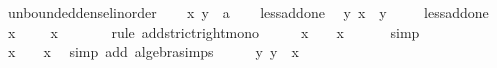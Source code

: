 \begin{isabellebody}
\endisatagproof
{\isafoldproof}%
%
\isadelimproof
\isanewline
%
\endisadelimproof
\isanewline
{}\isamarkupfalse%
\ unbounded{\isacharunderscore}{\kern0pt}dense{\isacharunderscore}{\kern0pt}linorder\isanewline
%
\isadelimproof
%
\endisadelimproof
%
\isatagproof
{}\isamarkupfalse%
\isanewline
\ \ \isamarkupfalse%
\ x\ y\ {\isacharcolon}{\kern0pt}{\isacharcolon}{\kern0pt}\ {\isacharprime}{\kern0pt}a\isanewline
\ \ \isamarkupfalse%
\ less{\isacharunderscore}{\kern0pt}add{\isacharunderscore}{\kern0pt}one\ \isamarkupfalse%
\ {\isachardoublequoteopen}{\isasymexists}y{\isachardot}{\kern0pt}\ x\ {\isacharless}{\kern0pt}\ y{\isachardoublequoteclose}\ \isacommand{{\isachardot}{\kern0pt}{\isachardot}{\kern0pt}}\isamarkupfalse%
\isanewline
\ \ \isamarkupfalse%
\ less{\isacharunderscore}{\kern0pt}add{\isacharunderscore}{\kern0pt}one\ \isamarkupfalse%
\ {\isachardoublequoteopen}x\ {\isacharplus}{\kern0pt}\ {\isacharparenleft}{\kern0pt}{\isacharminus}{\kern0pt}\ {}{\isacharparenright}{\kern0pt}\ {\isacharless}{\kern0pt}\ {\isacharparenleft}{\kern0pt}x\ {\isacharplus}{\kern0pt}\ {}{\isacharparenright}{\kern0pt}\ {\isacharplus}{\kern0pt}\ {\isacharparenleft}{\kern0pt}{\isacharminus}{\kern0pt}\ {}{\isacharparenright}{\kern0pt}{\isachardoublequoteclose}\ \isamarkupfalse%
\ {\isacharparenleft}{\kern0pt}rule\ add{\isacharunderscore}{\kern0pt}strict{\isacharunderscore}{\kern0pt}right{\isacharunderscore}{\kern0pt}mono{\isacharparenright}{\kern0pt}\isanewline
\ \ \isamarkupfalse%
\ \isamarkupfalse%
\ {\isachardoublequoteopen}x\ {\isacharminus}{\kern0pt}\ {}\ {\isacharless}{\kern0pt}\ x\ {\isacharplus}{\kern0pt}\ {}\ {\isacharminus}{\kern0pt}\ {}{\isachardoublequoteclose}\ \isamarkupfalse%
\ simp\isanewline
\ \ \isamarkupfalse%
\ \isamarkupfalse%
\ {\isachardoublequoteopen}x\ {\isacharminus}{\kern0pt}\ {}\ {\isacharless}{\kern0pt}\ x{\isachardoublequoteclose}\ \isamarkupfalse%
\ {\isacharparenleft}{\kern0pt}simp\ add{\isacharcolon}{\kern0pt}\ algebra{\isacharunderscore}{\kern0pt}simps{\isacharparenright}{\kern0pt}\isanewline
\ \ \isamarkupfalse%
\ \isamarkupfalse%
\ {\isachardoublequoteopen}{\isasymexists}y{\isachardot}{\kern0pt}\ y\ {\isacharless}{\kern0pt}\ x{\isachardoublequoteclose}\ \isacommand{{\isachardot}{\kern0pt}{\isachardot}{\kern0pt}}\isamarkupfalse%

\end{isabellebody}
